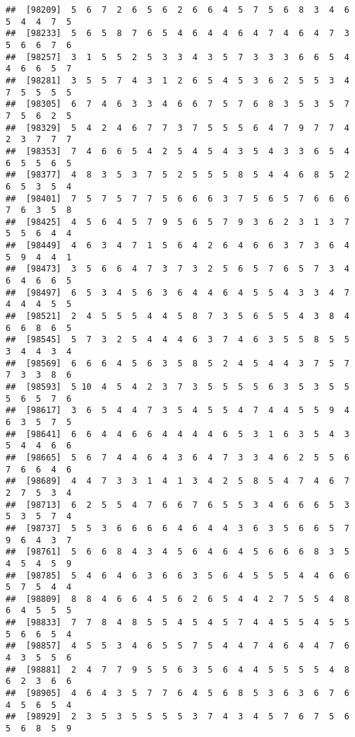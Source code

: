 \documentclass[
]{book}
\begin{document}
\begin{verbatim}
##  [98209]  5  6  7  2  6  5  6  2  6  6  4  5  7  5  6  8  3  4  6  5  4  4  7  5
##  [98233]  5  6  5  8  7  6  5  4  6  4  4  6  4  7  4  6  4  7  3  5  6  6  7  6
##  [98257]  3  1  5  5  2  5  3  3  4  3  5  7  3  3  3  6  6  5  4  4  6  6  5  7
##  [98281]  3  5  5  7  4  3  1  2  6  5  4  5  3  6  2  5  5  3  4  7  5  5  5  5
##  [98305]  6  7  4  6  3  3  4  6  6  7  5  7  6  8  3  5  3  5  7  7  5  6  2  5
##  [98329]  5  4  2  4  6  7  7  3  7  5  5  5  6  4  7  9  7  7  4  2  3  7  7  7
##  [98353]  7  4  6  6  5  4  2  5  4  5  4  3  5  4  3  3  6  5  4  6  5  5  6  5
##  [98377]  4  8  3  5  3  7  5  2  5  5  5  8  5  4  4  6  8  5  2  6  5  3  5  4
##  [98401]  7  5  7  5  7  7  5  6  6  6  3  7  5  6  5  7  6  6  6  7  6  3  5  8
##  [98425]  4  5  6  4  5  7  9  5  6  5  7  9  3  6  2  3  1  3  7  5  5  6  4  4
##  [98449]  4  6  3  4  7  1  5  6  4  2  6  4  6  6  3  7  3  6  4  5  9  4  4  1
##  [98473]  3  5  6  6  4  7  3  7  3  2  5  6  5  7  6  5  7  3  4  6  4  6  6  5
##  [98497]  6  5  3  4  5  6  3  6  4  4  6  4  5  5  4  3  3  4  7  4  4  4  5  5
##  [98521]  2  4  5  5  5  4  4  5  8  7  3  5  6  5  5  4  3  8  4  6  6  8  6  5
##  [98545]  5  7  3  2  5  4  4  4  6  3  7  4  6  3  5  5  8  5  5  3  4  4  3  4
##  [98569]  6  6  6  4  5  6  3  5  8  5  2  4  5  4  4  3  7  5  7  7  3  3  8  6
##  [98593]  5 10  4  5  4  2  3  7  3  5  5  5  5  6  3  5  3  5  5  5  6  5  7  6
##  [98617]  3  6  5  4  4  7  3  5  4  5  5  4  7  4  4  5  5  9  4  6  3  5  7  5
##  [98641]  6  6  4  4  6  6  4  4  4  4  6  5  3  1  6  3  5  4  3  5  4  4  6  6
##  [98665]  5  6  7  4  4  6  4  3  6  4  7  3  3  4  6  2  5  5  6  7  6  6  4  6
##  [98689]  4  4  7  3  3  1  4  1  3  4  2  5  8  5  4  7  4  6  7  2  7  5  3  4
##  [98713]  6  2  5  5  4  7  6  6  7  6  5  5  3  4  6  6  6  5  3  5  3  5  7  4
##  [98737]  5  5  3  6  6  6  6  4  6  4  4  3  6  3  5  6  6  5  7  9  6  4  3  7
##  [98761]  5  6  6  8  4  3  4  5  6  4  6  4  5  6  6  6  8  3  5  4  5  4  5  9
##  [98785]  5  4  6  4  6  3  6  6  3  5  6  4  5  5  5  4  4  6  6  5  7  5  4  4
##  [98809]  8  8  4  6  6  4  5  6  2  6  5  4  4  2  7  5  5  4  8  6  4  5  5  5
##  [98833]  7  7  8  4  8  5  5  4  5  4  5  7  4  4  5  5  4  5  5  5  6  6  5  4
##  [98857]  4  5  5  3  4  6  5  5  7  5  4  4  7  4  6  4  4  7  6  4  3  5  5  6
##  [98881]  2  4  7  7  9  5  5  6  3  5  6  4  4  5  5  5  5  4  8  6  2  3  6  6
##  [98905]  4  6  4  3  5  7  7  6  4  5  6  8  5  3  6  3  6  7  6  4  5  6  5  4
##  [98929]  2  3  5  3  5  5  5  5  3  7  4  3  4  5  7  6  7  5  6  5  6  8  5  9

\end{verbatim}
\end{document}
